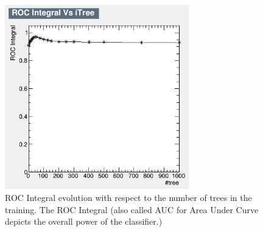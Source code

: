\documentclass{cernatlasnote}
\begin{document}
\begin{figure}[ht]
\centering
\includegraphics[height=8cm, width=8cm, trim= 0cm 0cm 0cm 0cm,clip]{images/TRKBDT/BDTDaniel_CONV.png}
\caption{\label{fig:BDTCONV} ROC Integral evolution with respect to the number of trees in the training. The ROC Integral (also called AUC for Area Under Curve depicts the overall power of the classifier.)}
\end{figure} 



\FloatBarrier
\pagebreak




\end{document}
